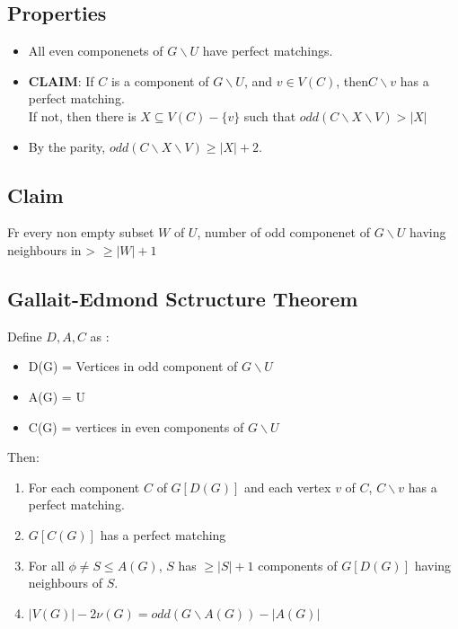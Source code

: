         \subsection{Properties}
            \begin{itemize}
                \item All even componenets of $G\backslash U$ have perfect matchings.\\
                \item \textbf{CLAIM}: If $C$ is a component of $G\backslash U$, and  $v\in V(C)$, then$C\backslash v$ has a perfect matching.\\
                    If not, then there is $X\subseteq V(C)-\{v\}$ such that $odd(C\backslash X \backslash V)>|X|$
                \item By the parity, $odd(C\backslash X \backslash V)\geq |X|+2$.\\
            \end{itemize}
        \subsection{Claim}
            Fr every non empty subset $W$ of $U$, number of odd componenet of $G\backslash U$ having neighbours in > $\geq |W|+1$
        \subsection{Gallait-Edmond Sctructure Theorem}
            Define $D, A, C$ as :\\
            \begin{itemize}
                \item D(G) = Vertices in odd component of $G\backslash U$
                \item A(G) = U
                \item C(G) = vertices in even components of $G\backslash U$
            \end{itemize}
            Then:\\
            \begin{enumerate}
                \item For each component $C$ of $G[D(G)]$ and each vertex $v$ of $C$, $C\backslash v$ has a perfect matching.\\
                \item $G[C(G)]$ has a perfect matching\\
                \item For all $\phi\neq S\leq A(G)$, $S$ has $\geq|S|+1$ components of $G[D(G)]$ having neighbours of $S$.
                \item $|V(G)|-2\nu(G)=odd(G\backslash A(G))-|A(G)|$
            \end{enumerate}
